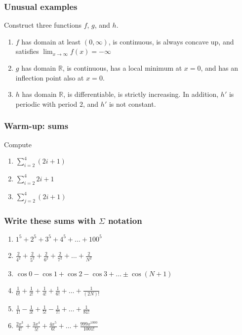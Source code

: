 \documentclass[14pt]{beamer}
\begin{document}
\begin{frame}[t]
	\frametitle{Unusual examples}

	Construct three functions $f$, $g$, and $h$.

	\begin{enumerate}
		\item $f$ has domain at least $(0,\infty)$, is continuous, is always concave
			up, and satisfies $\displaystyle \lim_{x \to \infty}f(x) = - \infty$

		\item $g$ has domain $\mathbb{R}$, is continuous, has a local minimum at $x=0$,
			and has an inflection point also at $x=0$.

		\item $h$ has domain $\mathbb{R}$, is differentiable, is strictly increasing.
			In addition, $h'$ is periodic with period $2$, and $h'$ is not constant.
	\end{enumerate}
\end{frame}

\begin{frame}[t]
	\frametitle{Warm-up: sums}

	Compute

	\begin{enumerate}
		\item $\displaystyle \sum_{i=2}^{4}(2i+1)$
			\vfill

		\item $\displaystyle \sum_{i=2}^{4}2i + 1$
			\vfill

		\item $\displaystyle \sum_{j=2}^{4}(2i + 1)$
			\vfill
	\end{enumerate}
\end{frame}

\begin{frame}[t]
	\fontsize{13}{13}\selectfont
	\frametitle{Write these sums with $\Sigma$ notation}

	\begin{enumerate}
		\item $\displaystyle 1^{5}+ 2^{5}+ 3^{5}+ 4^{5}+ \ldots + 100^{5}$
			\vfill

		\item $\displaystyle \frac{2}{4^{2}}+ \frac{2}{5^{2}}+ \frac{2}{6^{2}}+ \frac{2}{7^{2}}
			+ \ldots + \frac{2}{N^{2}}$
			\vfill

		\item $\displaystyle \cos 0 - \cos 1 + \cos 2 - \cos 3 + %
			\ldots \pm \cos (N+1)$
			\vfill

		\item $\displaystyle \frac{1}{0!}+ \frac{1}{2!}+ \frac{1}{4!}+ \frac{1}{6!}+
			\ldots + \frac{1}{(2N)!}$
			\vfill

		\item $\displaystyle \frac{1}{1!}- \frac{1}{3!}+ \frac{1}{5!}- \frac{1}{7!}+
			\ldots + \frac{1}{81!}$
			\vfill

		\item $\displaystyle \frac{2x^{3}}{ 4!}+ \frac{3x^{4}}{5!}+ \frac{4x^{5}}{6!}
			+ \ldots + \frac{999x^{1000}}{1001!}$
	\end{enumerate}
\end{frame}
\end{document}
